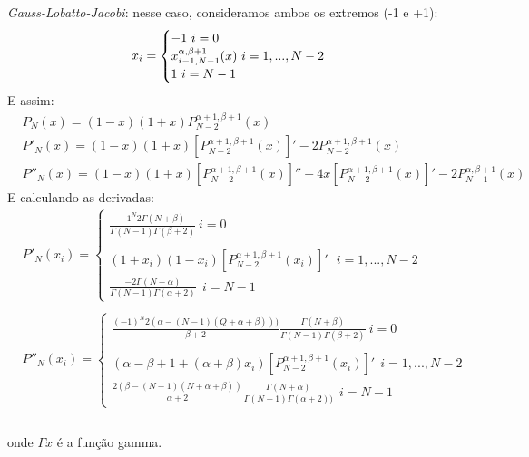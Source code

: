 \emph{Gauss-Lobatto-Jacobi}: nesse caso, consideramos ambos os extremos (-1 e +1):
\begin{equation}
 x_{i}= 
\begin{cases}
 -1 \ i = 0\\
 x^{\alpha,\beta +1}_{i-1,N-1}(x) \ i= 1,...,N-2\\
  1 \ i = N-1
\end{cases}\\
\end{equation}
 E assim:
 \begin{align}
  & P_{N}(x) =   (1-x)(1+x)P^{\alpha+1,\beta+1}_{N -2}(x)\\
  & P'_{N}(x) =  (1-x)(1+x)[P^{\alpha+1,\beta+1}_{N -2}(x)]' -  2P^{\alpha+1,\beta+1}_{N -2}(x)\\
  & P''_{N}(x) = (1-x)(1+x)[P^{\alpha+1,\beta+1}_{N -2}(x)]'' -4x[P^{\alpha+1,\beta+1}_{N -2}(x)]' - 2P^{\alpha,\beta+1}_{N -1}(x)
 \end{align}
 E calculando as derivadas:
 \begin{align}
  & P'_{N}(x_i)= 
\begin{cases}
 \frac{-1^{N}2\Gamma(N+ \beta)}{\Gamma(N-1)\Gamma(\beta+2)} \ i =0\\ \\
 (1+x_i)(1-x_i)[P^{\alpha+1,\beta+1}_{N-2}(x_i)]' \ \ \ i= 1,...,N-2\\ 
 \frac{-2\Gamma(N+\alpha)}{\Gamma(N-1)\Gamma(\alpha +2)} \ \ i = N-1
\end{cases}\\ \\
  & P''_{N}(x_i)= 
\begin{cases}
 \frac{(-1)^N 2(\alpha -(N-1)(Q+\alpha+\beta)))}{\beta + 2}\frac{\Gamma(N+\beta)}{\Gamma(N-1)\Gamma(\beta + 2)}\ i =0\\  \\
(\alpha -\beta +1+(\alpha+\beta)x_i)[P^{\alpha+1,\beta+1}_{N-2}(x_i)]'\ \ i= 1,...,N-2\\
\frac{2(\beta -(N-1)(N + \alpha + \beta))}{\alpha + 2}\frac{\Gamma(N+\alpha)}{\Gamma(N-1)\Gamma(\alpha+2))} \ \ i = N-1
\end{cases}\\
 \end{align}\\
 onde $\Gamma{x}$ é a função gamma.

